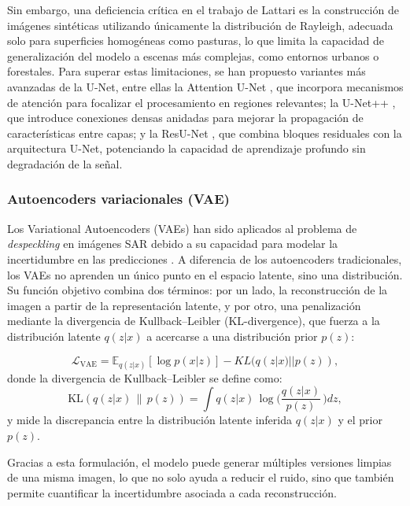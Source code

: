 Sin embargo, una deficiencia crítica en el trabajo de Lattari es la construcción de imágenes sintéticas utilizando únicamente la distribución de Rayleigh, adecuada solo para superficies homogéneas como pasturas, lo que limita la capacidad de generalización del modelo a escenas más complejas, como entornos urbanos o forestales. Para superar estas limitaciones, se han propuesto variantes más avanzadas de la U-Net, entre ellas la Attention U-Net \cite{oktay2018attention}, que incorpora mecanismos de atención para focalizar el procesamiento en regiones relevantes; la U-Net++ \cite{zhou2018unet++}, que introduce conexiones densas anidadas para mejorar la propagación de características entre capas; y la ResU-Net \cite{zhang2018road}, que combina bloques residuales con la arquitectura U-Net, potenciando la capacidad de aprendizaje profundo sin degradación de la señal.

\subsubsection{Autoencoders variacionales (VAE)}

Los Variational Autoencoders (VAEs) han sido aplicados al problema de \emph{despeckling} en imágenes SAR debido a su capacidad para modelar la incertidumbre en las predicciones \cite{mattei2019leveraging}. A diferencia de los autoencoders tradicionales, los VAEs no aprenden un único punto en el espacio latente, sino una distribución. Su función objetivo combina dos términos: por un lado, la reconstrucción de la imagen a partir de la representación latente, y por otro, una penalización mediante la divergencia de Kullback–Leibler (KL-divergence), que fuerza a la distribución latente $q(z|x)$ a acercarse a una distribución prior $p(z)$:

\begin{equation}
	\mathcal{L}_{\text{VAE}} = \mathbb{E}_{q(z|x)}[\log p(x|z)] - KL(q(z|x)||p(z)),
\end{equation}
donde la divergencia de Kullback--Leibler se define como:
\[
\mathrm{KL}\!\left(q(z|x)\,\|\,p(z)\right)
= \int q(z|x)\,\log\!\Big(\frac{q(z|x)}{p(z)}\,\Big)dz,
\]
y mide la discrepancia entre la distribución latente inferida \(q(z|x)\) y el prior \(p(z)\).

Gracias a esta formulación, el modelo puede generar múltiples versiones limpias de una misma imagen, lo que no solo ayuda a reducir el ruido, sino que también permite cuantificar la incertidumbre asociada a cada reconstrucción.

